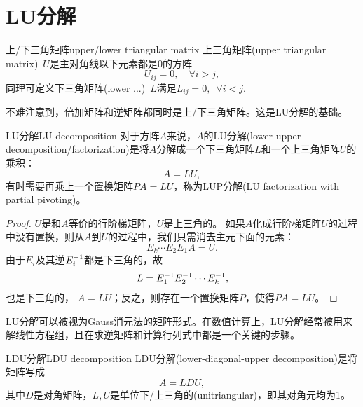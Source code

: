 \section{LU分解}
\begin{definition}{上/下三角矩阵}{upper/lower triangular matrix}
	上三角矩阵(upper triangular matrix)~$U$是主对角线以下元素都是0的方阵
	\[
		U_{ij}=0,\quad\forall i>j,
	\]
	同理可定义下三角矩阵(lower ...)~$L$满足$L_{ij}=0,\enspace\forall i<j.$
\end{definition}
不难注意到，倍加矩阵和逆矩阵都同时是上/下三角矩阵。这是LU分解的基础。
\begin{theorem}{LU分解}{LU decomposition}
	对于方阵$A$来说，$A$的LU分解(lower-upper decomposition/factorization)是将$A$分解成一个下三角矩阵$L$和一个上三角矩阵$U$的乘积：
	\begin{equation}
		A=LU,
	\end{equation}
	有时需要再乘上一个置换矩阵$PA=LU$，称为LUP分解(LU factorization with partial pivoting)。
\end{theorem}
\begin{proof}
	$U$是和$A$等价的行阶梯矩阵，$U$是上三角的。
	如果$A$化成行阶梯矩阵$U$的过程中没有置换，则从$A$到$U$的过程中，我们只需消去主元下面的元素：
	\[
		E_k\cdots E_2E_1A=U.
	\]
	由于$E_i$及其逆$E_i^{-1}$都是下三角的，故
	\[
		L=E_1^{-1} E_2^{-1}\cdots E_k^{-1},
	\]
	也是下三角的，%
	$A=LU$；反之，则存在一个置换矩阵$P$，使得$PA=LU$。
\end{proof}

\begin{remark}
	LU分解可以被视为Gauss消元法的矩阵形式。在数值计算上，LU分解经常被用来解线性方程组，且在求逆矩阵和计算行列式中都是一个关键的步骤。
\end{remark}

\begin{theorem}
	{LDU分解}{LDU decomposition}
	LDU分解(lower-diagonal-upper decomposition)是将矩阵写成
	\[
		A=LDU,
	\]
	其中$D$是对角矩阵，$L,U$是单位下/上三角的(unitriangular)，即其对角元均为1。
\end{theorem}




